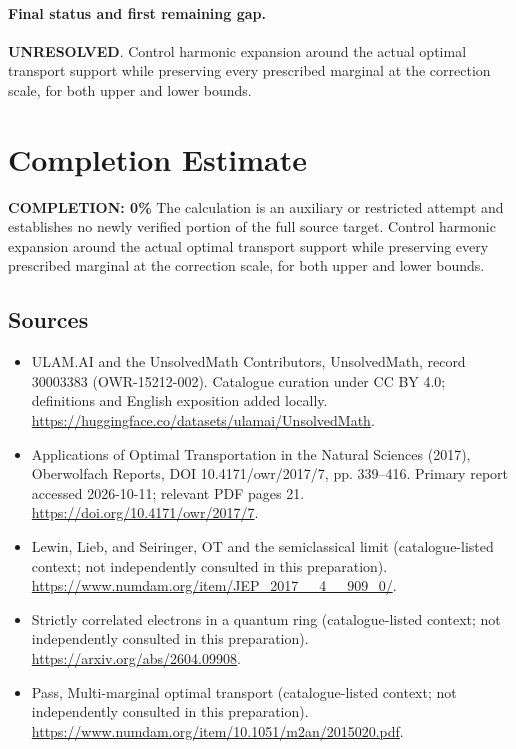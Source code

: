 \documentclass[11pt]{article}
\begin{document}
\paragraph{Final status and first remaining gap.}
\textbf{UNRESOLVED}. Control harmonic expansion around the actual optimal transport support while preserving every prescribed marginal at the correction scale, for both upper and lower bounds.

\section{Completion Estimate}
\noindent\textbf{COMPLETION: 0\%}
The calculation is an auxiliary or restricted attempt and establishes no newly verified portion of the full source target. Control harmonic expansion around the actual optimal transport support while preserving every prescribed marginal at the correction scale, for both upper and lower bounds.

\subsection{Sources}
\begin{itemize}
\item[\hypertarget{source:30003383:1}{S1}] ULAM.AI and the UnsolvedMath Contributors, UnsolvedMath, record 30003383 (OWR-15212-002). Catalogue curation under CC BY 4.0; definitions and English exposition added locally.
\url{https://huggingface.co/datasets/ulamai/UnsolvedMath}.
\item[\hypertarget{source:30003383:2}{S2}] Applications of Optimal Transportation in the Natural Sciences (2017), Oberwolfach Reports, DOI 10.4171/owr/2017/7, pp. 339--416. Primary report accessed 2026-10-11; relevant PDF pages 21.
\url{https://doi.org/10.4171/owr/2017/7}.
\item[\hypertarget{source:30003383:3}{S3}] Lewin, Lieb, and Seiringer, OT and the semiclassical limit (catalogue-listed context; not independently consulted in this preparation).
\url{https://www.numdam.org/item/JEP_2017__4__909_0/}.
\item[\hypertarget{source:30003383:4}{S4}] Strictly correlated electrons in a quantum ring (catalogue-listed context; not independently consulted in this preparation).
\url{https://arxiv.org/abs/2604.09908}.
\item[\hypertarget{source:30003383:5}{S5}] Pass, Multi-marginal optimal transport (catalogue-listed context; not independently consulted in this preparation).
\url{https://www.numdam.org/item/10.1051/m2an/2015020.pdf}.
\end{itemize}
\label{end:30003383}
\end{document}
